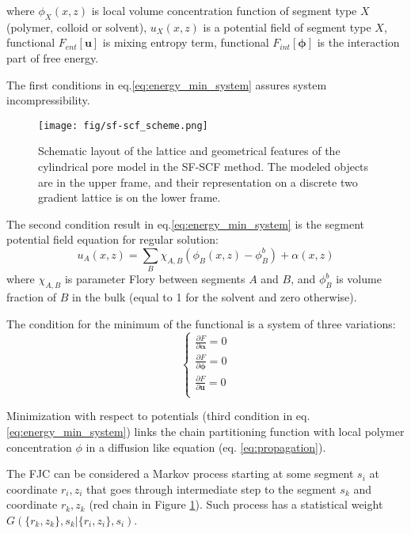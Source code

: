 \documentclass[10pt, a4paper]{article}
\begin{document}
\begin{multicols}{2}
where $\phi_X(x, z)$ is local volume concentration function of segment type $X$ (polymer, colloid or solvent), $u_X(x, z)$ is a potential field of segment type $X$, functional $F_{ent}[\mathbf{u}]$ is mixing entropy term, functional $F_{int} [\boldsymbol{\phi}]$ is the interaction part of free energy. 


The first conditions in eq.\ref{eq:energy_min_system} assures system incompressibility.

\begin{figure}[H]
    \centering
    \texttt{[image: fig/sf-scf\_scheme.png]}
    \caption{
    Schematic layout of the lattice and geometrical features of the cylindrical pore model in the SF-SCF method.
    The modeled objects are in the upper frame, and their representation on a discrete two gradient lattice is on the lower frame.
    }
\label{fig:sf-scf_scheme}
\end{figure}


The second condition result in eq.\ref{eq:energy_min_system} is the segment potential field equation for regular solution:
\begin{equation}
    \label{eq:u-phi}
    u_A(x, z) =\sum\limits_{B} \chi_{A,B} \left(\phi_B(x,z) - \phi_B^b \right) + \alpha(x, z)
\end{equation}
where $\chi_{A,B}$ is parameter Flory between segments $A$ and $B$, and $\phi_B^b$ is volume fraction of $B$ in the bulk (equal to 1 for the solvent and zero otherwise).


The condition for the minimum of the functional is a system of three variations:
\begin{equation}
    \label{eq:energy_min_system}
    \begin{cases}
        \frac{\partial F}{\partial \boldsymbol{\alpha}} = 0 \\
        \frac{\partial F}{\partial \boldsymbol{\phi}} = 0 \\
        \frac{\partial F}{\partial \mathbf{u}} = 0 \\
    \end{cases}
\end{equation}

Minimization with respect to potentials (third condition in eq.\ref{eq:energy_min_system}) links the chain partitioning function with local polymer concentration $\phi$ in a diffusion like equation (eq. \ref{eq:propagation}).

The FJC can be considered a Markov process starting at some segment $s_{i}$ at coordinate $r_{i}, z_{i}$ that goes through intermediate step to the segment $s_{k}$ and coordinate $r_{k}, z_{k}$ (red chain in Figure \ref{fig:sf-scf_scheme}).
Such process has a statistical weight $G(\{r_{k}, z_{k}\}, s_{k} | \{r_{i}, z_{i}\}, s_{i})$.


\end{multicols}
\end{document}
